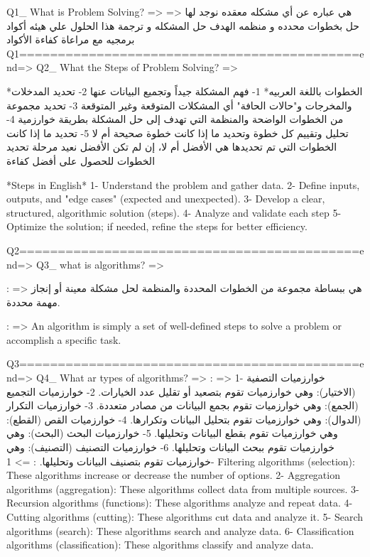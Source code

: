 Q1_ What is Problem Solving? => {
    \: =>
     هي عباره عن أي مشكله معقده نوجد لها حل بخطوات محدده و منظمه الهدف حل المشكله و ترجمة هذا الحلول علي هيئه أكواد برمجيه مع مراعاة كفاءة الأكواد
} 
                            Q1============================================end=>
Q2_ What the Steps of Problem Solving? => {
                                \/*الخطوات باللغة العربيه*\/
        1- فهم المشكلة جيداً وتجميع البيانات عنها
        2- تحديد المدخلات والمخرجات و"حالات الحافة" أي المشكلات المتوقعة وغير المتوقعة
        3- تحديد مجموعة من الخطوات الواضحة والمنظمة التي تهدف إلى حل المشكلة بطريقة خوارزمية
        4- تحليل وتقييم كل خطوة وتحديد ما إذا كانت خطوة صحيحة أم لا
        5- تحديد ما إذا كانت الخطوات التي تم تحديدها هي الأفضل أم لا، إن لم تكن الأفضل نعيد مرحلة تحديد الخطوات للحصول على أفضل كفاءة

                            \/*Steps in English*\/
        1- Understand the problem and gather data.
        2- Define inputs, outputs, and "edge cases" (expected and unexpected).
        3- Develop a clear, structured, algorithmic solution (steps).
        4- Analyze and validate each step
        5- Optimize the solution; if needed, refine the steps for better efficiency.
}
                            Q2============================================end=>
Q3_ what is algorithms? =>{
    \Arabic: => 
    هي ببساطة مجموعة من الخطوات المحددة والمنظمة لحل مشكلة معينة أو إنجاز مهمة محددة.
    
    \English: => 
    An algorithm is simply a set of well-defined steps to solve a problem or accomplish a specific task. 
}                           
                            Q3============================================end=>
Q4_ What ar types of algorithms? => {
 \types\in\Arabic: => 
 1- خوارزميات التصفية (الاختيار): وهي خوارزميات تقوم بتصعيد أو تقليل عدد الخيارات.
 2- خوارزميات التجميع (الجمع): وهي خوارزميات تقوم بجمع البيانات من مصادر متعددة.
 3- خوارزميات التكرار (الدوال): وهي خوارزميات تقوم بتحليل البيانات وتكرارها.
 4- خوارزميات القص (القطع): وهي خوارزميات تقوم بقطع البيانات وتحليلها.
 5- خوارزميات البحث (البحث): وهي خوارزميات تقوم ببحث البيانات وتحليلها.
 6- خوارزميات التصنيف (التصنيف): وهي خوارزميات تقوم بتصنيف البيانات وتحليلها.
 \types\in\English: =>
 1- Filtering algorithms (selection): These algorithms increase or decrease the number of options.
 2- Aggregation algorithms (aggregation): These algorithms collect data from multiple sources.
 3- Recursion algorithms (functions): These algorithms analyze and repeat data.
 4- Cutting algorithms (cutting): These algorithms cut data and analyze it.
 5- Search algorithms (search): These algorithms search and analyze data.
 6- Classification algorithms (classification): These algorithms classify and analyze data.
}                                                 
